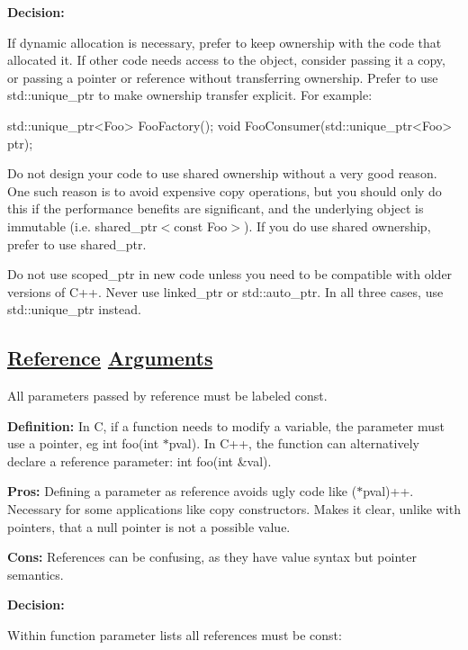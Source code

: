 {\bfseries Decision\+:}

If dynamic allocation is necessary, prefer to keep ownership with the code that allocated it. If other code needs access to the object, consider passing it a copy, or passing a pointer or reference without transferring ownership. Prefer to use {\ttfamily std\+::unique\+\_\+ptr} to make ownership transfer explicit. For example\+:


\begin{DoxyCode}
std::unique\_ptr<Foo> FooFactory();
\textcolor{keywordtype}{void} FooConsumer(std::unique\_ptr<Foo> ptr);
\end{DoxyCode}


Do not design your code to use shared ownership without a very good reason. One such reason is to avoid expensive copy operations, but you should only do this if the performance benefits are significant, and the underlying object is immutable (i.\+e. {\ttfamily shared\+\_\+ptr$<$const Foo$>$}). If you do use shared ownership, prefer to use shared\+\_\+ptr.

Do not use {\ttfamily scoped\+\_\+ptr} in new code unless you need to be compatible with older versions of C++. Never use {\ttfamily linked\+\_\+ptr} or {\ttfamily std\+::auto\+\_\+ptr}. In all three cases, use {\ttfamily std\+::unique\+\_\+ptr} instead.

\subsection*{\hyperlink{structReference}{Reference} \hyperlink{classArguments}{Arguments}}

All parameters passed by reference must be labeled {\ttfamily const}.

{\bfseries Definition\+:} In C, if a function needs to modify a variable, the parameter must use a pointer, eg int foo(int $\ast$pval). In C++, the function can alternatively declare a reference parameter\+: int foo(int \&val).

{\bfseries Pros\+:} Defining a parameter as reference avoids ugly code like ($\ast$pval)++. Necessary for some applications like copy constructors. Makes it clear, unlike with pointers, that a null pointer is not a possible value.

{\bfseries Cons\+:} References can be confusing, as they have value syntax but pointer semantics.

{\bfseries Decision\+:}

Within function parameter lists all references must be const\+:


